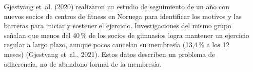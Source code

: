 Gjestvang et~al. (2020) realizaron un estudio de seguimiento de un año con
nuevos socios de centros de fitness en Noruega para identificar los motivos y
las barreras para iniciar y sostener el ejercicio. Investigaciones del mismo
grupo señalan que menos del 40\,\% de los socios de gimnasios logra mantener un
ejercicio regular a largo plazo, aunque pocos cancelan su membresía (13,4\,\% a
los 12 meses) (Gjestvang et~al., 2021). Estos datos describen un problema de
adherencia, no de abandono formal de la membresía.
